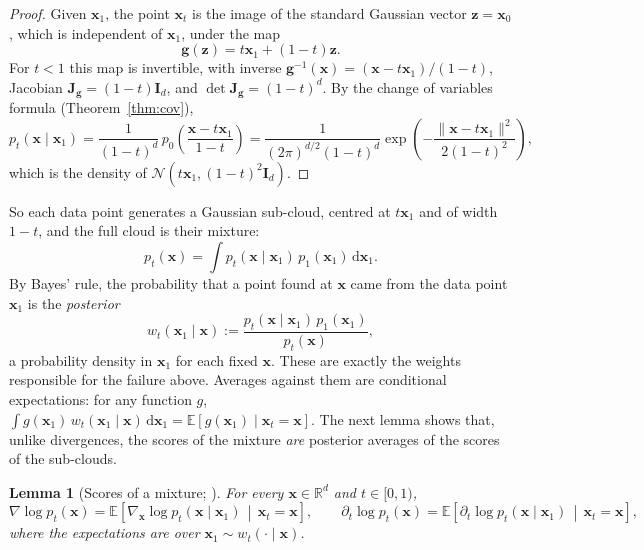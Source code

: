 \documentclass[11pt,a4paper]{article}
\numberwithin{equation}{section}     %
\theoremstyle{plain}        %
\newtheorem{lemma}[theorem]{Lemma}
\theoremstyle{definition}   %
\theoremstyle{remark}       %
\begin{document}
\begin{proof}
Given $\mathbf{x}_1$, the point $\mathbf{x}_t$ is the image of the standard Gaussian vector $\mathbf{z}=\mathbf{x}_0$, which is independent of $\mathbf{x}_1$, under the map
\[
\mathbf{g}(\mathbf{z})=t\mathbf{x}_1+(1-t)\mathbf{z}.
\]
For $t<1$ this map is invertible, with inverse $\mathbf{g}^{-1}(\mathbf{x})=(\mathbf{x}-t\mathbf{x}_1)/(1-t)$, Jacobian $\mathbf{J}_{\mathbf{g}}=(1-t)\mathbf{I}_d$, and $\det\mathbf{J}_{\mathbf{g}}=(1-t)^d$. By the change of variables formula (Theorem~\ref{thm:cov}),
\[
p_t(\mathbf{x}\mid\mathbf{x}_1)=\frac{1}{(1-t)^d}\,p_0\left(\frac{\mathbf{x}-t\mathbf{x}_1}{1-t}\right)=\frac{1}{(2\pi)^{d/2}(1-t)^d}\exp\left(-\frac{\|\mathbf{x}-t\mathbf{x}_1\|^2}{2(1-t)^2}\right),
\]
which is the density of $\mathcal{N}(t\mathbf{x}_1,(1-t)^2\mathbf{I}_d)$.
\end{proof}

So each data point generates a Gaussian sub-cloud, centred at $t\mathbf{x}_1$ and of width $1-t$, and the full cloud is their mixture:
\[
p_t(\mathbf{x})=\int p_t(\mathbf{x}\mid\mathbf{x}_1)\,p_1(\mathbf{x}_1)\,\mathrm{d}\mathbf{x}_1 .
\]
By Bayes' rule, the probability that a point found at $\mathbf{x}$ came from the data point $\mathbf{x}_1$ is the \emph{posterior}
\[
w_t(\mathbf{x}_1\mid\mathbf{x}):=\frac{p_t(\mathbf{x}\mid\mathbf{x}_1)\,p_1(\mathbf{x}_1)}{p_t(\mathbf{x})} ,
\]
a probability density in $\mathbf{x}_1$ for each fixed $\mathbf{x}$. These are exactly the weights responsible for the failure above. Averages against them are conditional expectations: for any function $g$, $\int g(\mathbf{x}_1)\,w_t(\mathbf{x}_1\mid\mathbf{x})\,\mathrm{d}\mathbf{x}_1=\mathbb{E}[g(\mathbf{x}_1)\mid\mathbf{x}_t=\mathbf{x}]$. The next lemma shows that, unlike divergences, the scores of the mixture \emph{are} posterior averages of the scores of the sub-clouds.

\begin{lemma}[Scores of a mixture; \citealp{vincent2011}]\label{lem:mixscores}
For every $\mathbf{x}\in\mathbb{R}^d$ and $t\in[0,1)$,
\[
\nabla\log p_t(\mathbf{x})=\mathbb{E}\left[\nabla_{\mathbf{x}}\log p_t(\mathbf{x}\mid\mathbf{x}_1)\,\middle|\,\mathbf{x}_t=\mathbf{x}\right],
\qquad
\partial_t\log p_t(\mathbf{x})=\mathbb{E}\left[\partial_t\log p_t(\mathbf{x}\mid\mathbf{x}_1)\,\middle|\,\mathbf{x}_t=\mathbf{x}\right],
\]
where the expectations are over $\mathbf{x}_1\sim w_t(\cdot\mid\mathbf{x})$.
\end{lemma}
\end{document}
